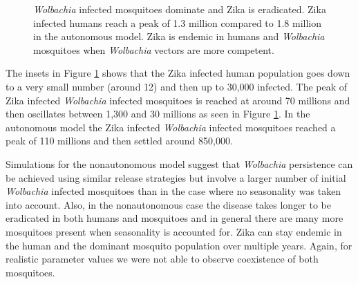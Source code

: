 \documentclass{ws-rv9x6}
\begin{document}
\begin{figure}[H]
\centering
    
    \makebox[0pt][l]{}%
    \makebox[0pt][l]{}%
\caption{\textit{Wolbachia} infected mosquitoes dominate and Zika is eradicated. Zika infected humans reach a peak of 1.3 million compared to 1.8 million in the autonomous model. Zika is endemic  in humans and \textit{Wolbachia} mosquitoes when \textit{Wolbachia} vectors are more competent.}\label{fig:newfig6c}
\end{figure}

The insets in Figure \ref{fig:newfig6c} shows that the Zika infected human population goes down to a very small number (around 12) and then up to 30,000 infected. The peak of Zika infected \textit{Wolbachia} infected mosquitoes is reached at around 70 millions and then oscillates between 1,300 and 30 millions as seen in Figure \ref{fig:newfig6c}. In the autonomous model the Zika infected \textit{Wolbachia} infected mosquitoes reached a peak of 110 millions and then settled around 850,000.


Simulations for the nonautonomous model suggest that \textit{Wolbachia} persistence can be achieved using similar release strategies but involve a larger number of initial \textit{Wolbachia} infected mosquitoes than in the case where no seasonality was taken into account. Also, in the nonautonomous case the disease takes longer to be eradicated in both humans and mosquitoes and in general there are many more mosquitoes present when seasonality is accounted for. Zika can stay endemic in the human and the dominant mosquito population over multiple years. Again, for realistic parameter values we were not able to observe coexistence of both mosquitoes. 
\end{document}
